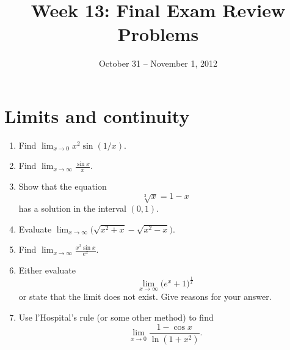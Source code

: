 \documentclass[10pt]{amsart}
\title{Week 13:  Final Exam Review Problems}
\date{October 31 -- November 1, 2012}
\theoremstyle{plain}
\theoremstyle{definition}
\newcommand{\limm}[1]{\displaystyle \lim_{x\to #1}}
\begin{document}
\maketitle

\section{Limits and continuity}
\begin{enumerate}
\item Find $\limm{0}x^2\sin(1/x)$.

\item Find $\limm{\infty}\frac{\sin x}{x}$.

\item Show that the equation \[\sqrt[3]{x}=1-x \] has a solution in the interval $(0,1)$.

\item Evaluate $\limm{\infty}\big(\sqrt{x^2+x}-\sqrt{x^2-x}\big)$.

\item Find $\limm{\infty}\frac{x^2\sin x}{e^x}$.

\item Either evaluate
\[ \lim_{x\to\infty}\Big(e^x+1\Big)^{\tfrac{1}{x}} \]
or state that the limit does not exist. Give reasons for your answer.

\item Use l'Hospital's rule (or some other method) to find
\[ \limm{0}\dfrac{1-\cos x}{\ln(1+x^2)}. \]
\end{enumerate}
\end{document}
